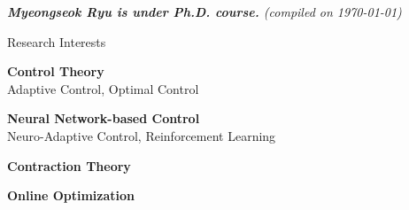 \documentclass{resume} %
\begin{document}
{
    \centerline {
        \em \textbf { Myeongseok Ryu is under Ph.D. course.} (compiled on \today)
    } 
}

\begin{minipage}[t]{0.5\textwidth}
    \begin{rSection}{Research Interests}
    \vspace{.5em}
    \small{
        {\bf Control Theory} 
        \\
        Adaptive Control, Optimal Control

        \vspace{.5em}
        {\bf Neural Network-based Control} 
        \\
        Neuro-Adaptive Control, Reinforcement Learning

        \vspace{.5em}
        {\bf Contraction Theory} 
        
        \vspace{.5em}
        {\bf Online Optimization}
    }
    \end{rSection}
\end{minipage}
\hfill
\end{document}
